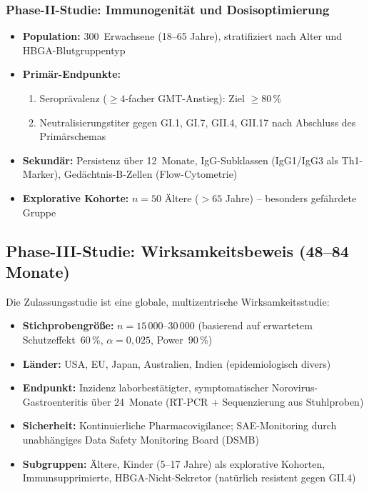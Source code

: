 ﻿\documentclass[a4paper,12pt]{article}
\theoremstyle{plain}
\theoremstyle{definition}
\theoremstyle{remark}
\begin{document}
\subsubsection{Phase-II-Studie: Immunogenität und Dosisoptimierung}

\begin{itemize}
  \item \textbf{Population:} 300~Erwachsene (18--65 Jahre), stratifiziert nach Alter
        und HBGA-Blutgruppentyp
  \item \textbf{Primär-Endpunkte:}
        \begin{enumerate}
          \item Seroprävalenz ($\geq\!4$-facher GMT-Anstieg): Ziel $\geq80\,\%$
          \item Neutralisierungstiter gegen GI.1, GI.7, GII.4, GII.17 nach Abschluss
                des Primärschemas
        \end{enumerate}
  \item \textbf{Sekundär:} Persistenz über 12~Monate, IgG-Subklassen (IgG1/IgG3
        als Th1-Marker), Gedächtnis-B-Zellen (Flow-Cytometrie)
  \item \textbf{Explorative Kohorte:} $n=50$ Ältere ($>65$ Jahre) -- besonders
        gefährdete Gruppe
\end{itemize}

\subsection{Phase-III-Studie: Wirksamkeitsbeweis (48--84 Monate)}

Die Zulassungsstudie ist eine globale, multizentrische Wirksamkeitsstudie:

\begin{itemize}
  \item \textbf{Stichprobengröße:} $n=15\,000$--$30\,000$ (basierend auf erwartetem
        Schutzeffekt~60\,\%, $\alpha=0{,}025$, Power~90\,\%)
  \item \textbf{Länder:} USA, EU, Japan, Australien, Indien (epidemiologisch divers)
  \item \textbf{Endpunkt:} Inzidenz laborbestätigter, symptomatischer Norovirus-
        Gastroenteritis über 24~Monate (RT-PCR + Sequenzierung aus Stuhlproben)
  \item \textbf{Sicherheit:} Kontinuierliche Pharmacovigilance; SAE-Monitoring
        durch unabhängiges Data Safety Monitoring Board (DSMB)
  \item \textbf{Subgruppen:} Ältere, Kinder (5--17 Jahre) als explorative Kohorten,
        Immunsupprimierte, HBGA-Nicht-Sekretor (natürlich resistent gegen GII.4)
\end{itemize}
\end{document}
